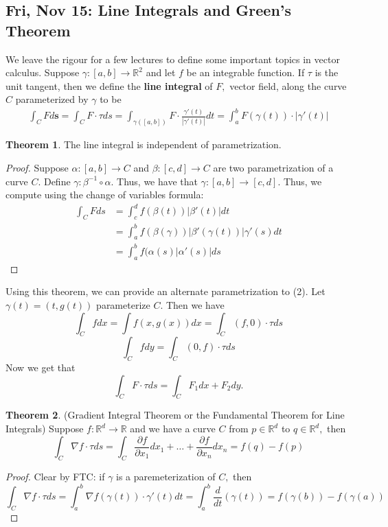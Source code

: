 \documentclass[10pt, oneside]{article}
\newcommand{\bbR}{\mathbb{R}}
\theoremstyle{definition}
\newtheorem{thm}{Theorem}
\begin{document}
\newpage
\subsection{Fri, Nov 15: Line Integrals and Green's Theorem}
We leave the rigour for a few lectures to define some important topics in vector calculus. Suppose $\gamma: [a,b]\to \bbR^2$ and let $f$ be an integrable function. If $\tau$ is the unit tangent, then we define the \textbf{line integral} of $F,$ vector field, along the curve $C$ parameterized by $\gamma$ to be
\begin{align}
\int_C F d\textbf{s} = \int_C F \cdot \tau ds = \int_{\gamma([a,b])}F \cdot \frac{\gamma'(t)}{|\gamma'(t)|}dt = \int_a^b F(\gamma(t))\cdot |\gamma'(t)|    
\end{align}


\begin{thm}
    The line integral is independent of parametrization.
\end{thm}
\begin{proof}
    Suppose $\alpha: [a,b]\to C$ and $\beta: [c,d] \to C$ are two parametrization of a curve $C.$ Define $\gamma: \beta^{-1}\circ \alpha.$ Thus, we have that $\gamma: [a,b]\to [c,d].$ Thus, we compute using the change of variables formula:
    \begin{align*}
        \int_C Fds &= \int_c^d f(\beta(t))|\beta'(t)|dt\\
        &= \int_a^b f(\beta(\gamma)) |\beta'(\gamma(t))|\gamma'(s)dt\\
        &= \int_a^b f(\alpha(s)|\alpha'(s)|ds
    \end{align*}
\end{proof}
Using this theorem, we can provide an alternate parametrization to (2). Let $\gamma(t) = (t,g(t))$ parameterize $C.$ Then we have 
\[\int_C f dx = \int f(x,g(x)) dx = \int_C (f,0) \cdot \tau ds\]
\[\int_C fdy  = \int_C (0,f)\cdot \tau ds\] Now we get that 
\[\int_C F \cdot \tau ds = \int_C F_1dx + F_2dy.\]
\begin{thm}
(Gradient Integral Theorem or the Fundamental Theorem for Line Integrals)
    Suppose $f: \bbR^d\to \bbR$ and we have a curve $C$ from $p \in \bbR^d$ to $q \in \bbR^d,$ then
    \[\int_C \nabla f \cdot \tau ds = \int_C \frac{\partial f}{\partial x_1}dx_1 + \dots + \frac{\partial f}{\partial x_n}dx_n = f(q) - f(p)\]
\end{thm}
\begin{proof}
    Clear by FTC: if $\gamma$ is a paremeterization of $C,$ then 
    \[\int_C \nabla f \cdot \tau ds = \int_a^b \nabla f(\gamma(t))\cdot \gamma'(t)dt = \int_a^b \frac{d}{dt}(\gamma(t)) = f(\gamma(b)) - f(\gamma(a))\]
\end{proof}
\end{document}
